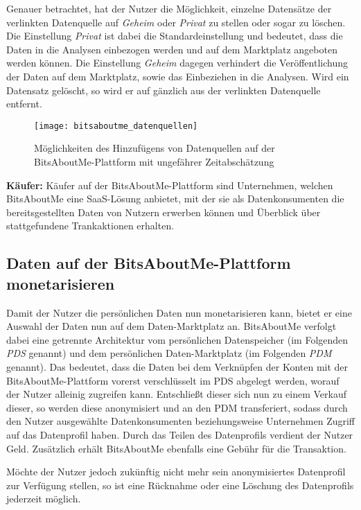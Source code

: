 \noindent Genauer betrachtet, hat der Nutzer die Möglichkeit, einzelne Datensätze der verlinkten Datenquelle auf \textit{Geheim} oder \textit{Privat} zu stellen oder sogar zu löschen. Die Einstellung \textit{Privat} ist dabei die Standardeinstellung und bedeutet, dass die Daten in die Analysen einbezogen werden und auf dem Marktplatz angeboten werden können. Die Einstellung \textit{Geheim} dagegen verhindert die Veröffentlichung der Daten auf dem Marktplatz, sowie das Einbeziehen in die Analysen. Wird ein Datensatz gelöscht, so wird er auf gänzlich aus der verlinkten Datenquelle entfernt.

\begin{figure}[!ht]
	\centering
	\texttt{[image: bitsaboutme\_datenquellen]}
	\caption{Möglichkeiten des Hinzufügens von Datenquellen auf der BitsAboutMe-Plattform mit ungefährer Zeitabschätzung}
	\label{fig:bitsaboutmeDatenquellen}
\end{figure}
\FloatBarrier

\noindent \textbf{Käufer:} Käufer auf der BitsAboutMe-Plattform sind Unternehmen, welchen BitsAboutMe eine SaaS-Lösung anbietet, mit der sie als Datenkonsumenten die bereitsgestellten Daten von Nutzern erwerben können und Überblick über stattgefundene Trankaktionen erhalten.

\subsection{Daten auf der BitsAboutMe-Plattform monetarisieren}
Damit der Nutzer die persönlichen Daten nun monetarisieren kann, bietet er eine Auswahl der Daten nun auf dem Daten-Marktplatz an. BitsAboutMe verfolgt dabei eine getrennte Architektur vom persönlichen Datenspeicher (im Folgenden \textit{PDS} genannt) und dem persönlichen Daten-Marktplatz (im Folgenden \textit{PDM} genannt). Das bedeutet, dass die Daten bei dem Verknüpfen der Konten mit der BitsAboutMe-Plattform vorerst verschlüsselt im PDS abgelegt werden, worauf der Nutzer alleinig zugreifen kann. Entschließt dieser sich nun zu einem Verkauf dieser, so werden diese anonymisiert und an den PDM transferiert, sodass durch den Nutzer ausgewählte Datenkonsumenten beziehungsweise Unternehmen Zugriff auf das Datenprofil haben. Durch das Teilen des Datenprofils verdient der Nutzer Geld. Zusätzlich erhält BitsAboutMe ebenfalls eine Gebühr für die Transaktion.\newline

\noindent Möchte der Nutzer jedoch zukünftig nicht mehr sein anonymisiertes Datenprofil zur Verfügung stellen, so ist eine Rücknahme oder eine Löschung des Datenprofils jederzeit möglich. \newline

